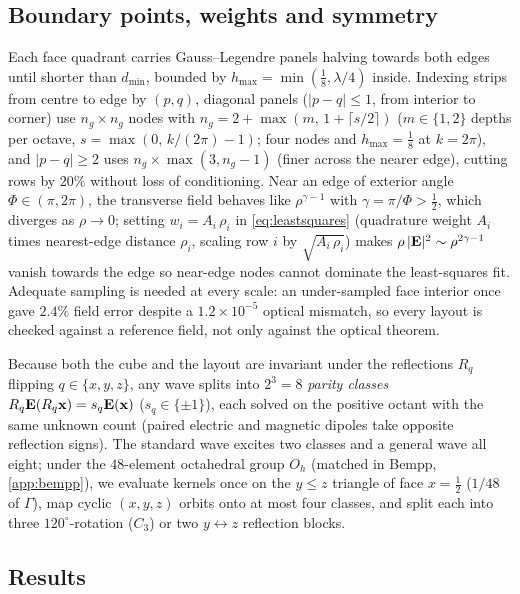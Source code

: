 \subsection{Boundary points, weights and symmetry}
\label{sec:cubepoints}

Each face quadrant carries Gauss--Legendre panels halving towards both edges until shorter than $d_{\min}$, bounded by $h_{\max} = \min(\tfrac18,\lambda/4)$ inside. Indexing strips from centre to edge by $(p,q)$, diagonal panels ($|p-q|\le 1$, from interior to corner) use $n_g\times n_g$ nodes with $n_g = 2 + \max(m,\,1+\lceil s/2\rceil)$ ($m\in\{1,2\}$ depths per octave, $s = \max(0,\,k/(2\pi)-1)$; four nodes and $h_{\max} = \tfrac18$ at $k = 2\pi$), and $|p-q|\ge 2$ uses $n_g\times\max(3,n_g-1)$ (finer across the nearer edge), cutting rows by $20\%$ without loss of conditioning. Near an edge of exterior angle $\Phi\in(\pi,2\pi)$, the transverse field behaves like $\rho^{\gamma-1}$ with $\gamma = \pi/\Phi > \tfrac12$, which diverges as $\rho\to0$; setting $w_i = A_i\,\rho_i$ in \eqref{eq:leastsquares} (quadrature weight $A_i$ times nearest-edge distance $\rho_i$, scaling row $i$ by $\sqrt{A_i\,\rho_i}$) makes $\rho\,|\mathbf{E}|^2\sim\rho^{2\gamma-1}$ vanish towards the edge so near-edge nodes cannot dominate the least-squares fit. Adequate sampling is needed at every scale: an under-sampled face interior once gave $2.4\%$ field error despite a $1.2\times10^{-5}$ optical mismatch, so every layout is checked against a reference field, not only against the optical theorem.

Because both the cube and the layout are invariant under the reflections $R_q$ flipping $q\in\{x,y,z\}$, any wave splits into $2^3 = 8$ \emph{parity classes} $R_q\mathbf{E}(R_q\mathbf{x}) = s_q\mathbf{E}(\mathbf{x})$ ($s_q\in\{\pm1\}$), each solved on the positive octant with the same unknown count (paired electric and magnetic dipoles take opposite reflection signs). The standard wave excites two classes and a general wave all eight; under the $48$-element octahedral group $O_h$ (matched in Bempp, \ref{app:bempp}), we evaluate kernels once on the $y\le z$ triangle of face $x=\tfrac12$ ($1/48$ of $\Gamma$), map cyclic $(x,y,z)$ orbits onto at most four classes, and split each into three $120^\circ$-rotation ($C_3$) or two $y\leftrightarrow z$ reflection blocks.

\subsection{Results}
\label{sec:cuberesults}

